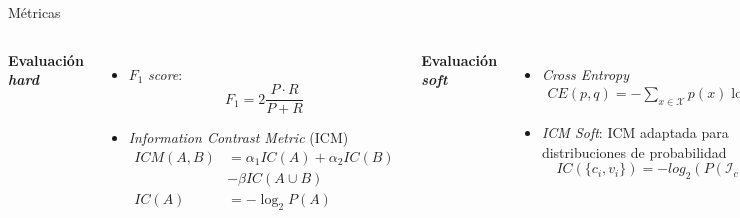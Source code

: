 \begin{frame}{M\'etricas}
    \begin{columns}[T]
        \centering
        \textbf{Evaluaci\'on \textit{hard}}
        \vspace{0.25cm}
        \begin{itemize}
            \item $F_1$ \textit{score}:
            $$ F_1 =  2\frac{P \cdot R}{P + R} $$
            \item \textit{Information Contrast Metric} (ICM) 
            \begin{align*}
                ICM(A, B) &= \alpha_1IC(A) + \alpha_2IC(B) \\
                          &- \beta IC(A \cup B) \\
                IC(A) &= -\log_2P(A)
            \end{align*}
        \end{itemize}
        
        \centering
        \textbf{Evaluaci\'on \textit{soft}}
        \vspace{0.25cm}
        \begin{itemize}
            \item \textit{Cross Entropy}
            \begin{align*}
                CE(p, q) = - \sum_{x \in \mathcal{X}} p(x) \log_2q(x)
            \end{align*}
            \item \textit{ICM Soft}: ICM adaptada para distribuciones de probabilidad
            $$
            IC(\{c_i, v_i\}) = -log_2(P(\mathcal{I}_c \geq v))
            $$
        \end{itemize}
    
    \end{columns}
\end{frame}